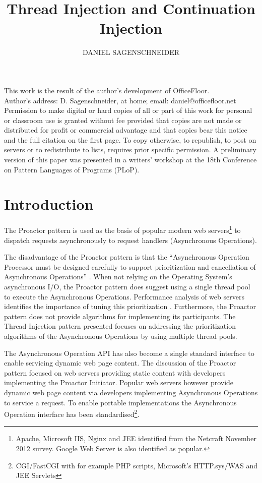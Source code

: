 \documentclass[prodmode]{style/acmlarge}
\title{Thread Injection and Continuation Injection}
\author{DANIEL SAGENSCHNEIDER \affil{daniel@officefloor.net}}
\begin{document}
\begin{bottomstuff}
This work is the result of the author's development of OfficeFloor.\\
Author's address: D. Sagenschneider, at home; email: daniel@officefloor.net\\

Permission to make digital or hard copies of all or part of this work for
personal or classroom use is granted without fee provided that copies are not
made or distributed for profit or commercial advantage and that copies bear this
notice and the full citation on the first page. To copy otherwise, to republish,
to post on servers or to redistribute to lists, requires prior specific
permission. A preliminary version of this paper was presented in a writers'
workshop at the 18th Conference on Pattern Languages of Programs (PLoP).
\end{bottomstuff}

\maketitle

\section{Introduction}

The Proactor pattern \cite{proactor} is used as the basis of popular modern web
servers\footnote{Apache, Microsoft IIS, Nginx and JEE identified from the
Netcraft November 2012 survey.  Google Web Server is also identified as
popular.} to dispatch requests asynchronously to request handlers (Asynchronous
Operations).

The disadvantage of the Proactor pattern is that the ``Asynchronous Operation
Processor must be designed carefully to support prioritization and cancellation
of Asynchronous Operations'' \cite{proactor}.  When not relying on the Operating
System's asynchronous I/O, the Proactor pattern does suggest using a single
thread pool to execute the Asynchronous Operations.  Performance analysis of web
servers identifies the importance of tuning this prioritization
\cite{tuning-important,low-server-footprint,tuning-os-important}.  Furthermore,
the Proactor pattern does not provide algorithms for implementing its
participants.  The Thread Injection pattern presented focuses on addressing the
prioritization algorithms of the Asynchronous Operations by using multiple
thread pools.

The Asynchronous Operation API has also become a single standard interface to
enable servicing dynamic web page content.  The discussion of the Proactor
pattern focused on web servers providing static content with developers
implementing the Proactor Initiator.  Popular web servers however provide
dynamic web page content via developers implementing Asynchronous Operations to
service a request.  To enable portable implementations the Asynchronous
Operation interface has been standardised\footnote{CGI/FastCGI with for
example PHP scripts, Microsoft's HTTP.sys/WAS and JEE Servlets}.
\end{document}
